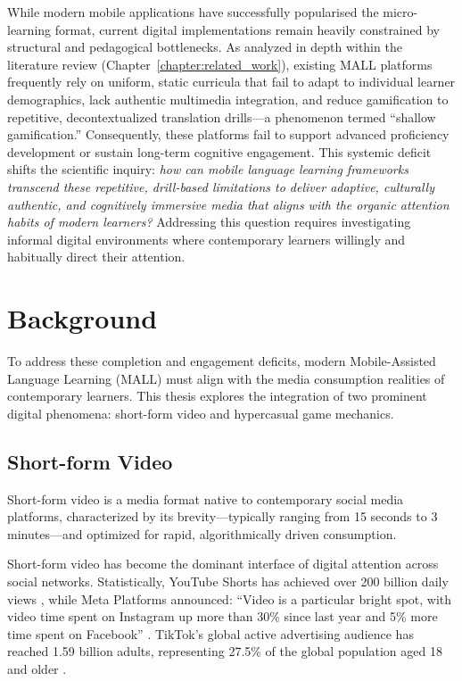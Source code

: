 While modern mobile applications have successfully popularised the micro-learning format, current digital implementations remain heavily constrained by structural and pedagogical bottlenecks. As analyzed in depth within the literature review (Chapter~\ref{chapter:related_work}), existing MALL platforms frequently rely on uniform, static curricula that fail to adapt to individual learner demographics, lack authentic multimedia integration, and reduce gamification to repetitive, decontextualized translation drills---a phenomenon termed ``shallow gamification.'' Consequently, these platforms fail to support advanced proficiency development or sustain long-term cognitive engagement. This systemic deficit shifts the scientific inquiry: \textit{how can mobile language learning frameworks transcend these repetitive, drill-based limitations to deliver adaptive, culturally authentic, and cognitively immersive media that aligns with the organic attention habits of modern learners?} Addressing this question requires investigating informal digital environments where contemporary learners willingly and habitually direct their attention.


\section{Background}

    To address these completion and engagement deficits, modern Mobile-Assisted Language Learning (MALL) must align with the media consumption realities of contemporary learners. This thesis explores the integration of two prominent digital phenomena: short-form video and hypercasual game mechanics.

    \subsection{Short-form Video}
    Short-form video is a media format native to contemporary social media platforms, characterized by its brevity---typically ranging from 15 seconds to 3 minutes---and optimized for rapid, algorithmically driven consumption.

    Short-form video has become the dominant interface of digital attention across social networks. Statistically, YouTube Shorts has achieved over 200 billion daily views \cite{mohan2026letter}, 
    while Meta Platforms announced: ``Video is a particular bright spot, with video time spent on Instagram up more than 30\% since last year and 5\% more time spent on Facebook'' \cite{zuckerberg2025q3}.
    TikTok's global active advertising audience has reached 1.59 billion adults, representing 27.5\% of the global population aged 18 and older \cite{kepios2025tiktok}. 

